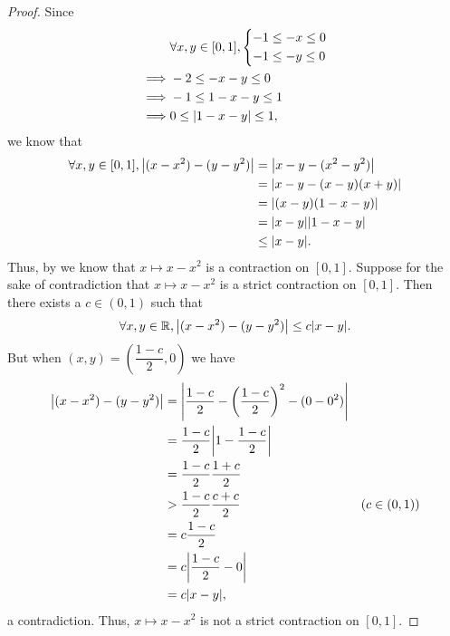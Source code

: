 \begin{proof}
  Since
  \begin{align*}
             & \forall x, y \in [0, 1], \begin{dcases}
                                          -1 \leq -x \leq 0 \\
                                          -1 \leq -y \leq 0
                                        \end{dcases} \\
    \implies & -2 \leq -x - y \leq 0                      \\
    \implies & -1 \leq 1 - x - y \leq 1                   \\
    \implies & 0 \leq \left\lvert1 - x - y\right\rvert \leq 1,
  \end{align*}
  we know that
  \begin{align*}
    \forall x, y \in [0, 1], \abs{(x - x^2) - (y - y^2)} & = \abs{x - y - (x^2 - y^2)}    \\
                                                         & = \abs{x - y - (x - y)(x + y)} \\
                                                         & = \abs{(x - y)(1 - x - y)}     \\
                                                         & = \abs{x - y} \abs{1 - x - y}  \\
                                                         & \leq \abs{x - y}.
  \end{align*}
  Thus, by  we know that \(x \mapsto x - x^2\) is a contraction on \([0, 1]\).
  Suppose for the sake of contradiction that \(x \mapsto x - x^2\) is a strict contraction on \([0, 1]\).
  Then there exists a \(c \in (0, 1)\) such that
  \[
    \forall x, y \in \R, \abs{(x - x^2) - (y - y^2)} \leq c \abs{x - y}.
  \]
  But when \((x, y) = (\dfrac{1 - c}{2}, 0)\) we have
  \begin{align*}
    \abs{(x - x^2) - (y - y^2)} & = \abs{\dfrac{1 - c}{2} - \bigg(\dfrac{1 - c}{2}\bigg)^2 - (0 - 0^2)}                  \\
                                & = \dfrac{1 - c}{2} \abs{1 - \dfrac{1 - c}{2}}                                          \\
                                & = \dfrac{1 - c}{2} \dfrac{1 + c}{2}                                                    \\
                                & > \dfrac{1 - c}{2} \dfrac{c + c}{2}                                   & (c \in (0, 1)) \\
                                & = c \dfrac{1 - c}{2}                                                                   \\
                                & = c \abs{\dfrac{1 - c}{2} - 0}                                                         \\
                                & = c \abs{x - y},
  \end{align*}
  a contradiction.
  Thus, \(x \mapsto x - x^2\) is not a strict contraction on \([0, 1]\).
\end{proof}

